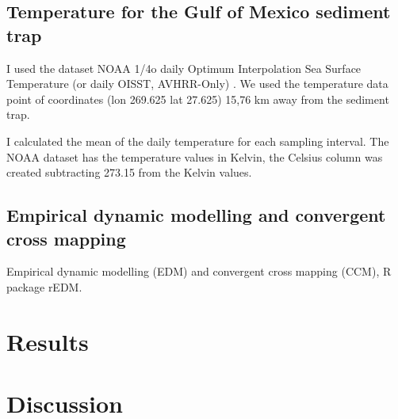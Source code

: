\documentclass[a4paper]{article}
\begin{document}
\subsection{Temperature for the Gulf of Mexico sediment trap}
I used the dataset NOAA 1/4o daily Optimum Interpolation Sea Surface Temperature (or daily OISST, AVHRR-Only) \citep{smith2016oisst}.  %
We used the temperature data point of coordinates (lon 269.625  lat 27.625) 15,76 km away from the sediment trap. 

I calculated the mean of the daily temperature for each sampling interval. The NOAA dataset has the temperature values in Kelvin, the Celsius column was created subtracting 273.15 from the Kelvin values. 


\subsection{Empirical dynamic modelling and convergent cross mapping}
Empirical dynamic modelling (EDM) and convergent cross mapping (CCM), R package rEDM.




\section{Results}
\label{sec:results}


\newpage

\section{Discussion}
\label{sec:discussion}




\label{Bibliography}
\end{document}
